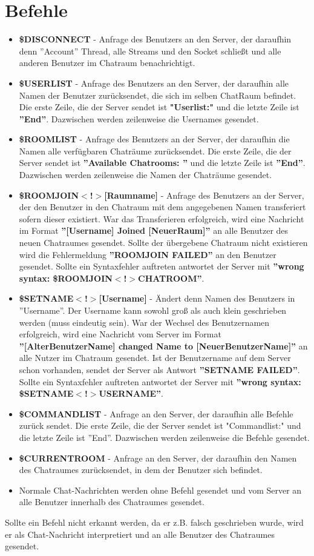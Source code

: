 \documentclass[a4paper, oneside]{scrreprt}
\begin{document}
\chapter{Befehle}
\begin{itemize}
\item \textbf{\$DISCONNECT} - Anfrage des Benutzers an den Server, der daraufhin denn ''Account'' Thread, alle Streams und den Socket schließt und alle anderen Benutzer im Chatraum benachrichtigt.
\item \textbf{\$USERLIST} - Anfrage des Benutzers an den Server, der daraufhin alle Namen der Benutzer zurücksendet, die sich im selben ChatRaum befindet. Die erste Zeile, die der Server sendet ist \textbf{"Userlist:"} und die letzte Zeile ist \textbf{''End''}. Dazwischen werden zeilenweise die Usernames gesendet. 
\item \textbf{\$ROOMLIST} - Anfrage des Benutzers an der Server, der daraufhin die Namen alle verfügbaren Chaträume zurücksendet. Die erste Zeile, die der Server sendet ist \textbf{''Available Chatrooms: ''} und die letzte Zeile ist \textbf{''End''}. Dazwischen werden zeilenweise die Namen der Chaträume gesendet.
\item \textbf{\$ROOMJOIN$<$!$>$[Raumname]} - Anfrage des Benutzers an der Server, der den Benutzer in den Chatraum mit dem angegebenen Namen transferiert sofern dieser existiert. War das Transferieren erfolgreich, wird eine Nachricht im Format \textbf{''[Username] Joined [NeuerRaum]''} an alle Benutzer des neuen Chatraumes gesendet. Sollte der übergebene Chatraum nicht existieren wird die Fehlermeldung \textbf{''ROOMJOIN FAILED''} an den Benutzer gesendet. Sollte ein Syntaxfehler auftreten antwortet der Server mit \textbf{''wrong syntax: \$ROOMJOIN$<$!$>$CHATROOM''}.
\item \textbf{\$SETNAME$<$!$>$[Username]} - Ändert denn Namen des Benutzers in ''Username''. Der Username kann
sowohl groß als auch klein geschrieben werden (muss eindeutig sein). War der Wechsel des Benutzernamen erfolgreich, wird eine Nachricht vom Server im Format \textbf{''[AlterBenutzerName] changed Name to [NeuerBenutzerName]''} an alle Nutzer im Chatraum gesendet. Ist der Benutzername auf dem Server schon vorhanden, sendet der Server als Antwort \textbf{''SETNAME FAILED''}. Sollte ein Syntaxfehler auftreten antwortet der Server mit \textbf{''wrong syntax: \$SETNAME$<$!$>$USERNAME''}.
\item \textbf{\$COMMANDLIST} - Anfrage an den Server, der daraufhin alle Befehle zurück sendet. Die erste Zeile, die der Server sendet ist "Commandlist:" und die letzte Zeile ist ''End''. Dazwischen werden zeilenweise die Befehle gesendet.
\item \textbf{\$CURRENTROOM} - Anfrage an den Server, der daraufhin den Namen des Chatraumes zurücksendet, in dem der Benutzer sich befindet. 
\item Normale Chat-Nachrichten werden ohne Befehl gesendet und vom Server an alle Benutzer innerhalb des Chatraumes gesendet.
\end{itemize}
Sollte ein Befehl nicht erkannt werden, da er z.B. falsch geschrieben wurde, wird er als Chat-Nachricht interpretiert und an alle Benutzer des Chatraumes gesendet.
\newpage
\end{document}
